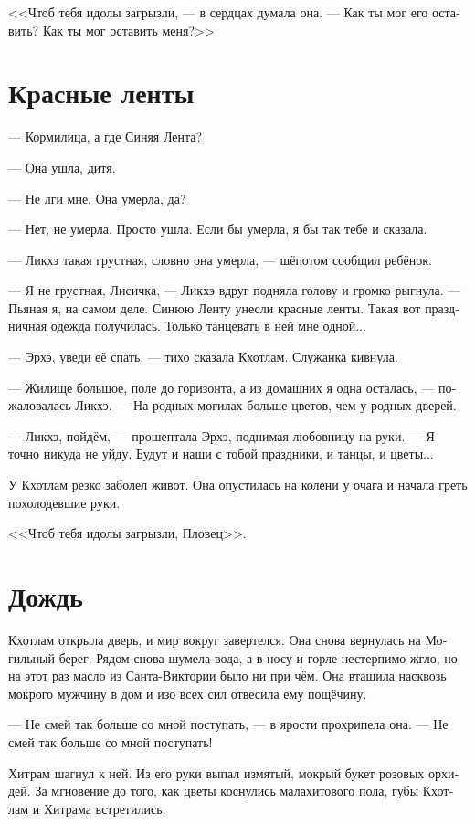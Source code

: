 \documentclass[a4paper,12pt,fleqn]{book}\usepackage{cooltooltips}\usepackage{polyglossia}\setdefaultlanguage[babelshorthands=true]{russian}\setotherlanguage{english}\defaultfontfeatures{Ligatures=TeX,Mapping=tex-text} \usepackage{xcolor}\definecolor{lightgray}{HTML}{bbbbbb}\color{lightgray}\newcommand{\ml}[3]{\textenglish{\textcolor{black}{#3}} }
\begin{document}
<<Чтоб тебя идолы загрызли, --- в сердцах думала она.
--- Как ты мог его оставить?
Как ты мог оставить меня?>>

\section{Красные ленты}

--- Кормилица, а где Синяя Лента?

--- Она ушла, дитя.

--- Не лги мне.
Она умерла, да?

--- Нет, не умерла.
Просто ушла.
Если бы умерла, я бы так тебе и сказала.

--- Ликхэ такая грустная, словно она умерла, --- шёпотом сообщил ребёнок.

--- Я не грустная, Лисичка, --- Ликхэ вдруг подняла голову и громко рыгнула.
--- Пьяная я, на самом деле.
Синюю Ленту унесли красные ленты.
Такая вот праздничная одежда получилась.
Только танцевать в ней мне одной...

--- Эрхэ, уведи её спать, --- тихо сказала Кхотлам.
Служанка кивнула.

--- Жилище большое, поле до горизонта, а из домашних я одна осталась, --- пожаловалась Ликхэ.
--- На родных могилах больше цветов, чем у родных дверей. 

--- Ликхэ, пойдём, --- прошептала Эрхэ, поднимая любовницу на руки.
--- Я точно никуда не уйду.
Будут и наши с тобой праздники, и танцы, и цветы...

У Кхотлам резко заболел живот.
Она опустилась на колени у очага и начала греть похолодевшие руки.

<<Чтоб тебя идолы загрызли, Пловец>>.

\section{Дождь}

Кхотлам открыла дверь, и мир вокруг завертелся.
Она снова вернулась на Могильный берег.
Рядом снова шумела вода, а в носу и горле нестерпимо жгло, но на этот раз масло из Санта-Виктории было ни при чём.
Она втащила насквозь мокрого мужчину в дом и изо всех сил отвесила ему пощёчину.

--- Не смей так больше со мной поступать, --- в ярости прохрипела она.
--- Не смей так больше со мной поступать!

Хитрам шагнул к ней.
Из его руки выпал измятый, мокрый букет розовых орхидей.
За мгновение до того, как цветы коснулись малахитового пола, губы Кхотлам и Хитрама встретились.
\end{document}
